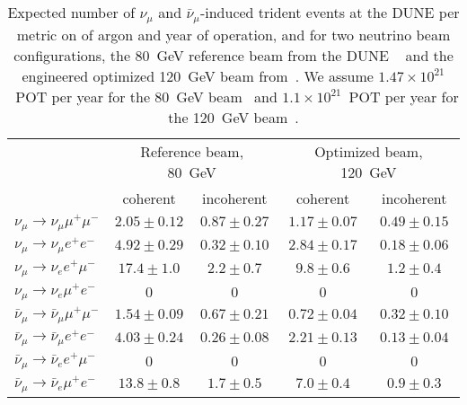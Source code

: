 \begin{table}[!b]
\begin{center}
\begin{tabular}{lcccc}
\toprule
& \multicolumn{2}{c}{Reference beam, 80~GeV} & \multicolumn{2}{c}{Optimized beam, 120~GeV} \\
& coherent & incoherent & coherent & incoherent \\
\midrule
$\nu_\mu \to \nu_\mu \mu^+\mu^-$ & $2.05 \pm 0.12$ & $0.87 \pm 0.27$ & $1.17 \pm 0.07$ & $0.49 \pm 0.15$ \\
$\nu_\mu \to \nu_\mu e^+e^-$ & $4.92 \pm 0.29$ & $0.32 \pm 0.10$ & $2.84 \pm 0.17$ & $0.18 \pm 0.06$\\
$\nu_\mu \to \nu_e e^+\mu^-$ & $17.4 \pm 1.0$ & $2.2 \pm 0.7$ & $9.8 \pm 0.6$ & $1.2 \pm 0.4$ \\
$\nu_\mu \to \nu_e \mu^+e^-$ & $0$ & $0$ & $0$ & $0$ \\
\midrule
$\bar\nu_\mu \to \bar\nu_\mu \mu^+\mu^-$ & $1.54 \pm 0.09$ & $0.67 \pm 0.21$ & $0.72 \pm 0.04$ & $0.32 \pm 0.10$ \\
$\bar\nu_\mu \to \bar\nu_\mu e^+e^-$ & $4.03 \pm 0.24$ & $0.26 \pm 0.08$ & $2.21 \pm 0.13$ & $0.13 \pm 0.04$ \\
$\bar\nu_\mu \to \bar\nu_e e^+\mu^-$ & $0$ & $0$ & $0$ & $0$ \\
$\bar\nu_\mu \to \bar\nu_e \mu^+e^-$ & $13.8 \pm 0.8$ & $1.7 \pm 0.5$ & $7.0 \pm 0.4$ & $0.9 \pm 0.3$ \\
\bottomrule
\end{tabular}
\end{center}
\caption[Expected number of  $\nu_\mu$ and $\bar\nu_\mu$-induced trident events at  per ton of argon and year of operation]{Expected number of   $\nu_\mu$ and $\bar\nu_\mu$-induced trident events at the DUNE   per metric on of argon and year of operation, and for two neutrino beam configurations, the 80~GeV reference beam from the DUNE ~\cite{cdr-vol-2} and the engineered optimized 120~GeV beam from~\cite{fields_doc_2901}. We assume $1.47 \times 10^{21}$~POT per year for the 80~GeV beam~\cite{cdr-vol-2} and  $1.1 \times 10^{21}$~POT per year for the 120~GeV beam~\cite{fields_doc_2901}.}
\label{tab:trident_rates}
\end{table}

